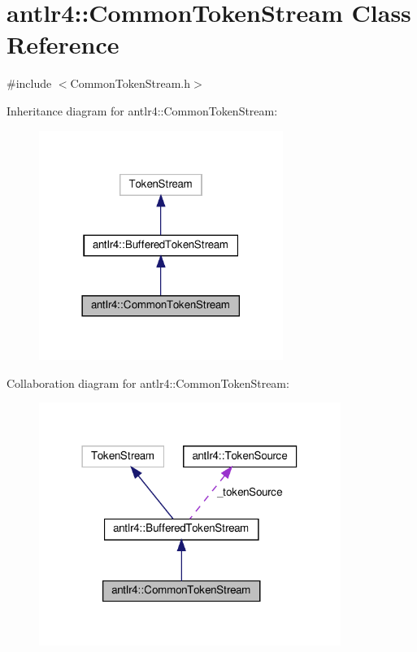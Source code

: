 \hypertarget{classantlr4_1_1CommonTokenStream}{}\section{antlr4\+:\+:Common\+Token\+Stream Class Reference}
\label{classantlr4_1_1CommonTokenStream}


{\ttfamily \#include $<$Common\+Token\+Stream.\+h$>$}



Inheritance diagram for antlr4\+:\+:Common\+Token\+Stream\+:
\nopagebreak
\begin{figure}[H]
\begin{center}
\leavevmode
\includegraphics[width=225pt]{classantlr4_1_1CommonTokenStream__inherit__graph}
\end{center}
\end{figure}


Collaboration diagram for antlr4\+:\+:Common\+Token\+Stream\+:
\nopagebreak
\begin{figure}[H]
\begin{center}
\leavevmode
\includegraphics[width=278pt]{classantlr4_1_1CommonTokenStream__coll__graph}
\end{center}
\end{figure}
